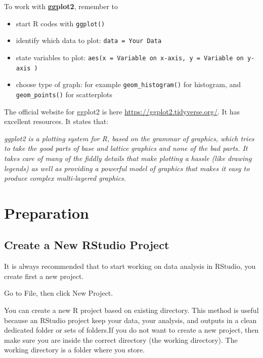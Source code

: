 \documentclass[
  10pt,
]{krantz}
\providecommand{\tightlist}{%
  \setlength{\itemsep}{0pt}\setlength{\parskip}{0pt}}
\begin{document}
To work with \textbf{ggplot2}, remember to

\begin{itemize}
\tightlist
\item
  start R codes with \texttt{ggplot()}
\item
  identify which data to plot: \texttt{data\ =\ Your\ Data}
\item
  state variables to plot: \texttt{aes(x\ =\ Variable\ on\ x-axis,\ y\ =\ Variable\ on\ y-axis\ )}
\item
  choose type of graph: for example \texttt{geom\_histogram()} for histogram, and \texttt{geom\_points()} for scatterplots
\end{itemize}

The official website for ggplot2 is here \url{https://ggplot2.tidyverse.org/}. It has excellent resources. It states that:

\emph{ggplot2 is a plotting system for R, based on the grammar of graphics, which tries to take the good parts of base and lattice graphics and none of the bad parts. It takes care of many of the fiddly details that make plotting a hassle (like drawing legends) as well as providing a powerful model of graphics that makes it easy to produce complex multi-layered graphics.}

\hypertarget{preparation}{%
\section{Preparation}\label{preparation}}

\hypertarget{create-a-new-rstudio-project}{%
\subsection{Create a New RStudio Project}\label{create-a-new-rstudio-project}}

It is always recommended that to start working on data analysis in RStudio, you create first a new project.

Go to File, then click New Project.

You can create a new R project based on existing directory. This method is useful because an RStudio project keep your data, your analysis, and outputs in a clean dedicated folder or sets of folders.If you do not want to create a new project, then make sure you are inside the correct directory (the working directory). The working directory is a folder where you store.
\end{document}
